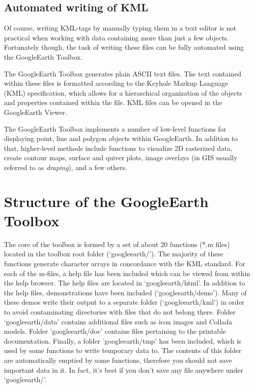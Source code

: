 \subsection{Automated writing of KML}
Of course, writing KML-tags by manually typing them in a text editor is not practical when working with data containing more than just a few objects. Fortunately though, the task of writing these files can be fully automated using the GoogleEarth Toolbox.

The GoogleEarth Toolbox generates plain ASCII text files. The text contained within these files is formatted according to the Keyhole Markup Language (KML) specification, which allows for a hierarchical organization of the objects and properties contained within the file. KML files can be opened in the GoogleEarth Viewer.

The GoogleEarth Toolbox implements a number of low-level functions for displaying point, line and polygon objects within GoogleEarth. In addition to that, higher-level methods include functions to visualize 2D rasterized data, create contour maps, surface and quiver plots, image overlays (in GIS usually referred to as \textit{draping}), and a few others.

\section{Structure of the GoogleEarth Toolbox}
The core of the toolbox is formed by a set of about 20 \MATLAB{} functions (*.m files) located in the toolbox root folder (`googleearth/'). The majority of these functions generate character arrays in concordance with the KML standard. For each of the m-files, a help file has been included which can be viewed from within the \MATLAB{} help browser. The help files are located in `googleearth/html'. In addition to the help files, demonstrations have been included (`googleearth/demo'). Many of these demos write their output to a separate folder (`googleearth/kml') in order to avoid contaminating directories with files that do not belong there. Folder `googleearth/data' contains additional files such as icon images and Collada models. Folder 'googleearth/doc' contains files pertaining to the printable documentation. Finally, a folder 'googleearth/tmp' has been included, which is used by some functions to write temporary data to. The contents of this folder are automatically emptied by some functions, therefore you should not save important data in it. In fact, it's best if you don't save any file anywhere under `googleearth/'.


